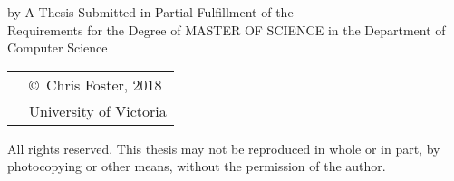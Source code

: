 \pagebreak

{
  \centering
  \thesistitle
  \tpbreak
  by
  \tpbreak
  \nameanddegrees
  \tpbreak
  A Thesis Submitted in Partial Fulfillment of the \\
  Requirements for the Degree of
  \tpbreak
  MASTER OF SCIENCE
  \tpbreak
  in the Department of Computer Science\\
  \vfill
  \begin{tabular}{cl}
    & \copyright\ Chris Foster, 2018\\
    & \phantom{\copyright} University of Victoria
  \end{tabular}
  \tpbreak
  All rights reserved. This thesis may not be reproduced in whole or in part, 
  by \\
  \hfill 
  photocopying or other means, without the permission of the author.  
  \hfill
}

\pagebreak
